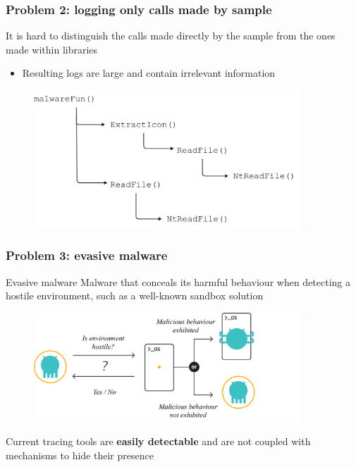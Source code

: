 \documentclass[compress]{beamer}
\begin{document}
\begin{frame}[fragile]
    \frametitle{Problem 2: logging only calls made by sample}

It is hard to distinguish the calls made directly by the sample from the ones made within libraries
\begin{itemize}
\item Resulting logs are large and contain irrelevant information
\end{itemize}

    \begin{figure}
    	\vspace{-0.2cm}
    	\hspace*{-0.2cm}
        \includegraphics[width=10cm]{image/MainImage11.pdf}
    \end{figure}

\end{frame}

\begin{frame}[fragile]
    \frametitle{Problem 3: evasive malware}
    
     \begin{beamerboxesrounded}[shadow=true]{Evasive malware}
Malware that conceals its harmful behaviour when detecting a
hostile environment, such as a well-known sandbox
solution
    \end{beamerboxesrounded}
    \bigskip
    \bigskip
    \begin{figure}
    	\vspace{-0.8cm}
    	\hspace*{0.5cm}
        \includegraphics[width=10cm]{image/evasive.pdf}
    \end{figure}
\vspace{-0.3cm}
Current tracing tools are \textbf{easily detectable} and are not coupled with mechanisms to hide their presence

\end{frame}
\end{document}
